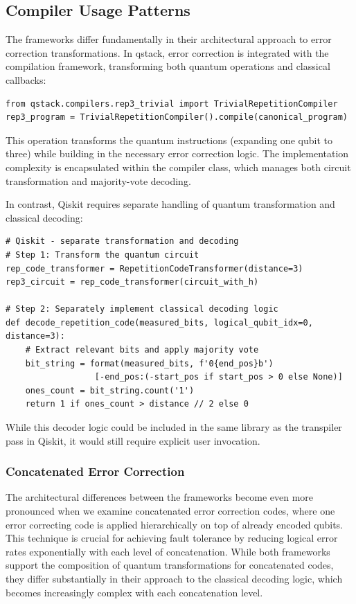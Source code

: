 \subsection{Compiler Usage Patterns}

The frameworks differ fundamentally in their architectural approach to error correction transformations. In qstack, error correction is integrated with the compilation framework, transforming both quantum operations and classical callbacks:

\begin{verbatim}
from qstack.compilers.rep3_trivial import TrivialRepetitionCompiler
rep3_program = TrivialRepetitionCompiler().compile(canonical_program)
\end{verbatim}

This operation transforms the quantum instructions (expanding one qubit to three) while building in the necessary error correction logic. The implementation complexity is encapsulated within the compiler class, which manages both circuit transformation and majority-vote decoding.

In contrast, Qiskit requires separate handling of quantum transformation and classical decoding:

\begin{verbatim}
# Qiskit - separate transformation and decoding
# Step 1: Transform the quantum circuit
rep_code_transformer = RepetitionCodeTransformer(distance=3)
rep3_circuit = rep_code_transformer(circuit_with_h)

# Step 2: Separately implement classical decoding logic
def decode_repetition_code(measured_bits, logical_qubit_idx=0, distance=3):
    # Extract relevant bits and apply majority vote
    bit_string = format(measured_bits, f'0{end_pos}b')
                  [-end_pos:(-start_pos if start_pos > 0 else None)]
    ones_count = bit_string.count('1')
    return 1 if ones_count > distance // 2 else 0
\end{verbatim}

While this decoder logic could be included in the same library as the transpiler pass in Qiskit, it would still require explicit user invocation.

\subsubsection{Concatenated Error Correction}

The architectural differences between the frameworks become even more pronounced when we examine concatenated error correction codes, where one error correcting code is applied hierarchically on top of already encoded qubits. This technique is crucial for achieving fault tolerance by reducing logical error rates exponentially with each level of concatenation. While both frameworks support the composition of quantum transformations for concatenated codes, they differ substantially in their approach to the classical decoding logic, which becomes increasingly complex with each concatenation level.


